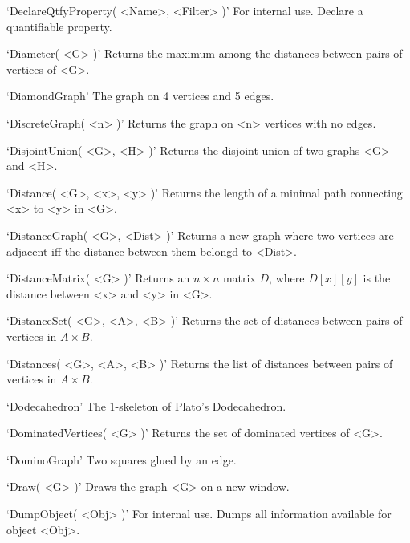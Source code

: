 `DeclareQtfyProperty( <Name>, <Filter> )'\newline\hglue 5mm 
For internal use. Declare a quantifiable property.

`Diameter( <G> )'\newline\hglue 5mm 
Returns the maximum among the distances between pairs of vertices of <G>.

`DiamondGraph'\newline\hglue 5mm 
The graph on 4 vertices and 5 edges.

`DiscreteGraph( <n> )'\newline\hglue 5mm 
Returns the graph on <n> vertices with no edges.

`DisjointUnion( <G>, <H> )'\newline\hglue 5mm 
Returns the disjoint union of two graphs <G> and <H>.

`Distance( <G>, <x>, <y> )'\newline\hglue 5mm 
Returns the length of a minimal path connecting <x> to <y> in <G>.

`DistanceGraph( <G>, <Dist> )'\newline\hglue 5mm 
Returns a new graph where two vertices are adjacent iff the distance between them belongd to <Dist>.

`DistanceMatrix( <G> )'\newline\hglue 5mm 
Returns an $n\times n$ matrix $D$, where $D[x][y]$ is the distance between <x> and <y> in <G>.

`DistanceSet( <G>, <A>, <B> )'\newline\hglue 5mm 
Returns the set of distances between pairs of vertices in $A\times B$.

`Distances( <G>, <A>, <B> )'\newline\hglue 5mm 
Returns the list of distances between pairs of vertices in $A\times B$.

`Dodecahedron'\newline\hglue 5mm 
The 1-skeleton of Plato's Dodecahedron.

`DominatedVertices( <G> )'\newline\hglue 5mm 
Returns the set of dominated vertices of <G>.

`DominoGraph'\newline\hglue 5mm 
Two squares glued by an edge.

`Draw( <G> )'\newline\hglue 5mm 
Draws the graph <G> on a new window.

`DumpObject( <Obj> )'\newline\hglue 5mm 
For internal use. Dumps  all information available for object <Obj>.

